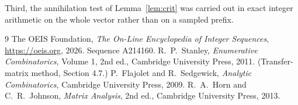 \documentclass[11pt,a4paper]{article}
\theoremstyle{plain}
\theoremstyle{definition}
\begin{document}
Third, the annihilation test of Lemma~\ref{lem:crit} was carried out in exact integer
arithmetic on the whole vector rather than on a sampled prefix.

\begin{thebibliography}{9}
 The OEIS Foundation, \emph{The On-Line Encyclopedia of Integer
Sequences}, \url{https://oeis.org}, 2026. Sequence A214160.
 R.~P.~Stanley, \emph{Enumerative Combinatorics}, Volume 1, 2nd ed.,
Cambridge University Press, 2011. (Transfer-matrix method, Section 4.7.)
 P.~Flajolet and R.~Sedgewick, \emph{Analytic Combinatorics}, Cambridge
University Press, 2009.
 R.~A.~Horn and C.~R.~Johnson, \emph{Matrix Analysis}, 2nd ed., Cambridge
University Press, 2013.
\end{thebibliography}
\end{document}

